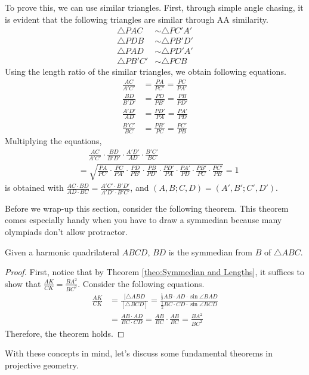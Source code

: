 \documentclass[../../../main.tex]{subfiles}
\begin{document}
To prove this, we can use similar triangles. First, through simple
angle chasing, it is evident that the following triangles are
similar through AA similarity.
\begin{align*}
    \triangle{PAC} &\sim \triangle{PC'A'} \\
    \triangle{PDB} &\sim \triangle{PB'D'} \\
    \triangle{PAD} &\sim \triangle{PD'A'} \\
    \triangle{PB'C'} &\sim \triangle{PCB}
\end{align*}
Using the length ratio of the similar triangles, we obtain following
equations.
\begin{align*}
    \frac{AC}{A'C'} &= \frac{PA}{PC'} = \frac{PC}{PA'} \\
    \frac{BD}{B'D'} &= \frac{PD}{PB'} = \frac{PB}{PD'} \\
    \frac{A'D'}{AD} &= \frac{PD'}{PA} = \frac{PA'}{PD} \\
    \frac{B'C'}{BC} &= \frac{PB'}{PC} = \frac{PC'}{PB}
\end{align*}
Multiplying the equations,
\begin{align*}
    &\quad\ \frac{AC}{A'C'} \cdot \frac{BD}{B'D'} \cdot \frac{A'D'}{AD}
        \cdot \frac{B'C'}{BC} \\
    &= \sqrt{
        \frac{PA}{PC'} \cdot \frac{PC}{PA'} \cdot
        \frac{PD}{PB'} \cdot \frac{PB}{PD'} \cdot
        \frac{PD'}{PA} \cdot \frac{PA'}{PD} \cdot
        \frac{PB'}{PC} \cdot \frac{PC'}{PB}
    }
    = 1
\end{align*}
is obtained with $\frac{AC \cdot BD}{AD \cdot BC} =
\frac{A'C' \cdot B'D'}{A'D' \cdot B'C'}$, and $(A, B; C, D) =
(A', B'; C', D')$.

Before we wrap-up this section, consider the following theorem.
This theorem comes especially handy when you have to draw a symmedian
because many olympiads don't allow protractor.

\begin{theorem}{}{}
Given a harmonic quadrilateral $ABCD$, $BD$ is the symmedian from $B$
of $\triangle{ABC}$.
\end{theorem}
\begin{proof}
First, notice that by Theorem \ref{theo:Symmedian and Lengths},
it suffices to show that $\frac{AK}{CK} = \frac{BA^2}{BC^2}$.
Consider the following equations.
\begin{align*}
    \frac{AK}{CK}
    &= \frac{[\triangle{ABD}}{[\triangle{BCD}]}
    = \frac{
        \frac{1}{2} AB \cdot AD \cdot \sin\angle{BAD}
    }{
        \frac{1}{2} BC \cdot CD \cdot \sin\angle{BCD}
    } \\
    &= \frac{AB \cdot AD}{BC \cdot CD}
    = \frac{AB}{BC} \cdot \frac{AB}{BC}
    = \frac{BA^2}{BC^2}
\end{align*}
Therefore, the theorem holds.
\end{proof}

With these concepts in mind, let's discuss some fundamental theorems
in projective geometry.
\end{document}
